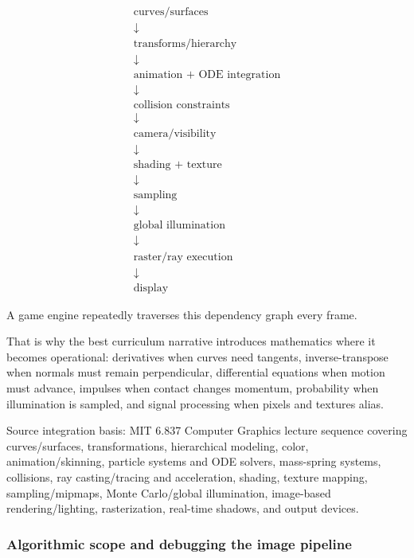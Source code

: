 \[
\boxed{
\begin{array}{c}
\text{curves/surfaces}\\
\downarrow\\
\text{transforms/hierarchy}\\
\downarrow\\
\text{animation + ODE integration}\\
\downarrow\\
\text{collision constraints}\\
\downarrow\\
\text{camera/visibility}\\
\downarrow\\
\text{shading + texture}\\
\downarrow\\
\text{sampling}\\
\downarrow\\
\text{global illumination}\\
\downarrow\\
\text{raster/ray execution}\\
\downarrow\\
\text{display}
\end{array}
}
\]

A game engine repeatedly traverses this dependency graph every frame.

That is why the best curriculum narrative introduces mathematics where it becomes operational: derivatives when curves need tangents, inverse-transpose when normals must remain perpendicular, differential equations when motion must advance, impulses when contact changes momentum, probability when illumination is sampled, and signal processing when pixels and textures alias.

Source integration basis: MIT 6.837 Computer Graphics lecture sequence covering curves/surfaces, transformations, hierarchical modeling, color, animation/skinning, particle systems and ODE solvers, mass-spring systems, collisions, ray casting/tracing and acceleration, shading, texture mapping, sampling/mipmaps, Monte Carlo/global illumination, image-based rendering/lighting, rasterization, real-time shadows, and output devices.

\subsubsection{Algorithmic scope and debugging the image pipeline}\label{algorithmic-scope-and-debugging-the-image-pipeline}

